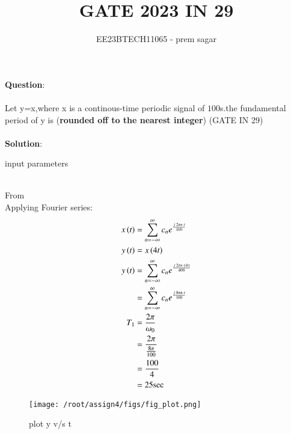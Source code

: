 \documentclass[journal,12pt,twocolumn]{IEEEtran}
\theoremstyle{remark}
\begin{document}

\vspace{3cm}

\title{GATE 2023 IN 29}
\author{EE23BTECH11065 - prem sagar}
\maketitle
\newpage

\bigskip 

\renewcommand{\thefigure}{\theenumi}
\renewcommand{\thetable}{\theenumi}
\textbf{Question}:
\\\\Let y=x,where x is a continous-time periodic signal of $100$s.the fundamental period of y is (\textbf{rounded off to the nearest integer})
 \hfill(GATE IN 29)
 \\\\\textbf{Solution}:
\begin{table}[!ht]
\def\arraystretch{1.5}
   \centering
    \renewcommand\thetable{1}
      
    \caption{input parameters}
    \label{tab:IN 29}
 \end{table}
\\From {}
\\Applying Fourier series:
 \begin{align}
 x\left(t\right)&=\sum_{n=-\infty}^{\infty}c_ne^\frac{j\;2\pi n\;t}{100}
\\ y\left(t\right)&=x\left(4t\right)
\\ y\left(t\right)&=\sum_{n=-\infty}^{\infty}c_ne^\frac{j\;2\pi n\;\left(4t\right)}{400}
\\&=\sum_{n=-\infty}^{\infty}c_ne^\frac{j\;8\pi n\;t}{100}
\\T_1&=\frac{2\pi}{\omega_0}
\\&=\frac{2\pi}{\frac{8\pi}{100}}
\\&=\frac{100}{4}
\\&=25\text{sec}
 \end{align}
\begin{figure}[h]
 \renewcommand\thefigure{1}
    \centering
    \texttt{[image: /root/assign4/figs/fig\_plot.png]}
    \caption{plot y v/s t}
    \label{fig:enter-label}
\end{figure}
\end{document}
